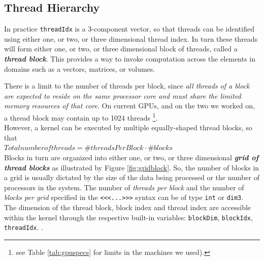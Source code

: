 \subsection{Thread Hierarchy}  
\label{subs:thrhierarchy}
In practice \texttt{threadIdx} is a 3-component vector, so that threads can be identified using either one, or two, or three dimensional thread index.
In turn these threads will form	either one, or two, or three dimensional block of threads, called a
\textbf{\textit{thread block}}.
This provides a way to invoke computation across the elements in domains such as a vectors, matrices, or volumes.


There is a limit to the number of threads per block, since \textit{all threads of a block are expected to reside on the same processor core and must share the limited memory resources of that core}. On current GPUs, and on the two we worked on, a thread block may contain up to 1024 threads \footnote{see Table \ref{tab:gpuspecs} for limits in the machines we used).}.\\
However, a kernel can be executed by multiple equally-shaped thread blocks, so that\\
\(Total number of threads = \#threadsPerBlock \cdot \#blocks\)\\	 
Blocks in turn are organized into either one, or two, or three dimensional \textit{\textbf{grid of thread blocks}} as illustrated by Figure \ref{fig:gridblock}.	
So, the number of blocks in a grid is usually dictated by the size of the data being processed or the number of processors in the system.
The number of \textit{threads per block} and the number of \textit{blocks per grid} specified in the 	\texttt{<<<...>>>} syntax can be of type \texttt{int} or \texttt{dim3}.\\
The dimension of the thread block, block index and thread index are accessible within the kernel through the respective built-in variables: \texttt{blockDim}, \texttt{blockIdx}, \texttt{threadIdx}. \cite{cudaguide}.

